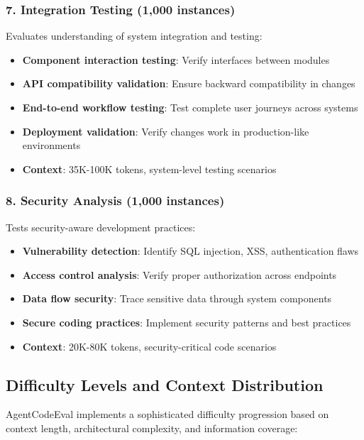 \documentclass{article}
\begin{document}
\subsubsection{7. Integration Testing (1,000 instances)}
Evaluates understanding of system integration and testing:
\begin{itemize}
    \item \textbf{Component interaction testing}: Verify interfaces between modules
    \item \textbf{API compatibility validation}: Ensure backward compatibility in changes
    \item \textbf{End-to-end workflow testing}: Test complete user journeys across systems
    \item \textbf{Deployment validation}: Verify changes work in production-like environments
    \item \textbf{Context}: 35K-100K tokens, system-level testing scenarios
\end{itemize}

\subsubsection{8. Security Analysis (1,000 instances)}
Tests security-aware development practices:
\begin{itemize}
    \item \textbf{Vulnerability detection}: Identify SQL injection, XSS, authentication flaws
    \item \textbf{Access control analysis}: Verify proper authorization across endpoints
    \item \textbf{Data flow security}: Trace sensitive data through system components
    \item \textbf{Secure coding practices}: Implement security patterns and best practices
    \item \textbf{Context}: 20K-80K tokens, security-critical code scenarios
\end{itemize}

\subsection{Difficulty Levels and Context Distribution}

AgentCodeEval implements a sophisticated difficulty progression based on context length, architectural complexity, and information coverage:
\end{document}
